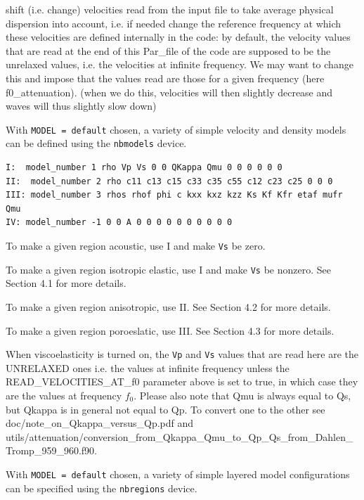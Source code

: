 \begin{description}[font=\ttfamily]
\item[READ\_VELOCITIES\_AT\_f0]

 shift (i.e. change) velocities read from the input file to take average physical dispersion into account, i.e. if needed change the reference frequency at which these velocities are defined internally in the code: by default, the velocity values that are read at the end of this Par\_file of the code are supposed to be the unrelaxed values, i.e. the velocities at infinite frequency. We may want to change this and impose that the values read are those for a given frequency (here f0\_attenuation). (when we do this, velocities will then slightly decrease and waves will thus slightly slow down)


\item[nbmodels]  With \texttt{MODEL = default} chosen, a variety of simple velocity and density models can be defined using the \texttt{nbmodels} device.

%
\begin{verbatim}
I:  model_number 1 rho Vp Vs 0 0 QKappa Qmu 0 0 0 0 0 0
II:  model_number 2 rho c11 c13 c15 c33 c35 c55 c12 c23 c25 0 0 0
III: model_number 3 rhos rhof phi c kxx kxz kzz Ks Kf Kfr etaf mufr Qmu
IV: model_number -1 0 0 A 0 0 0 0 0 0 0 0 0 0
\end{verbatim}
%

To make a given region acoustic, use I and make \texttt{Vs} be zero.

To make a given region isotropic elastic, use I and make \texttt{Vs} be nonzero.  See Section 4.1 for more details.

To make a given region anisotropic, use II.  See Section 4.2 for more details.

To make a given region poroeslatic, use III.  See Section 4.3 for more details.

When viscoelasticity is turned on, the \texttt{Vp} and \texttt{Vs} values that are read here are the UNRELAXED ones i.e. the values at infinite frequency
unless the READ\_VELOCITIES\_AT\_f0 parameter above is set to true, in which case they are the values at frequency $f_0$.
Please also note that Qmu is always equal to Qs, but Qkappa is in general not equal to Qp. To convert one to the other see doc/note\_on\_Qkappa\_versus\_Qp.pdf and utils/attenuation/conversion\_from\_Qkappa\_Qmu\_to\_Qp\_Qs\_from\_Dahlen\_Tromp\_959\_960.f90.

\item[nbregions]  With \texttt{MODEL = default} chosen, a variety of simple layered model configurations can be specified using the \texttt{nbregions} device.



\end{description}

